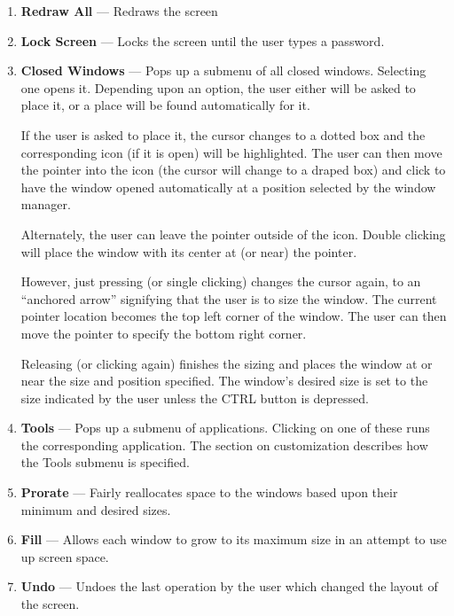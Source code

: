 \begin{enumerate}
\item {\bf Redraw All} --- Redraws the screen

\item {\bf Lock Screen} --- Locks the screen until the user types a password.

\item 
{\bf Closed Windows} --- Pops up a submenu of all closed windows.
Selecting one opens it.
Depending upon an option, the user either will
be asked to place it, or a place will be found automatically for it.

If the user is asked to place it, the cursor changes to a dotted box and
the corresponding icon (if it is open) will be highlighted.
The user can then move the pointer into the icon (the cursor will change
to a draped box) and click to have
the window opened automatically at a position
selected by the window manager.

Alternately, the user can leave the pointer outside of the icon.
Double clicking will place the window with its center at (or near) the
pointer.

However, just pressing (or single clicking) changes the cursor again, to
an ``anchored arrow'' signifying that the user is to size the window.
The current pointer location becomes the top left corner of the window.
The user can then move the pointer to specify the bottom right corner.

Releasing (or clicking again) finishes the sizing and places the
window at or near the size and position specified.  The
window's desired size is set to the size indicated by the user unless the
CTRL button is depressed.


\item {\bf Tools} --- Pops up a submenu of applications.
Clicking on one of these runs the corresponding application.
The section on customization describes how the Tools submenu is
specified.

\item {\bf Prorate} --- Fairly reallocates space to the windows based upon their
minimum and desired sizes.

\item {\bf Fill} --- Allows each window to grow to its maximum size in an attempt
to use up screen space.

\item {\bf Undo} --- Undoes the last operation by the user which changed the
layout of the screen.


\end{enumerate}
